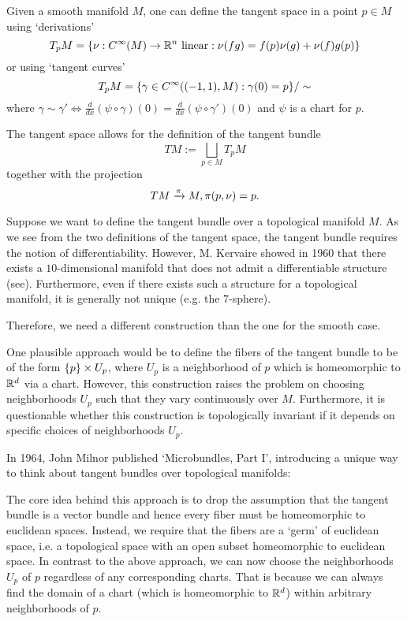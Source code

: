\begin{myparagraph}
    Given a smooth manifold $M$,
    one can define the tangent space
    in a point $p \in M$ using `derivations'
    \[
        T_p M = \{\nu: C^\infty(M) \to \mathbb{R}^n \text{ linear}:\nu(fg)
        = f(p)\nu(g) + \nu(f)g(p)\}
    \]
    or using `tangent curves'
    \[ T_p M = \{\gamma \in C^\infty((-1, 1), M):\gamma(0) = p \} / \sim \]
    where $\gamma \sim \gamma' \iff \frac{d}{dx}(\psi \circ \gamma)(0) = \frac{d}{dx}(\psi \circ \gamma')(0)$
    and $\psi$ is a chart for $p$.

    The tangent space allows for the definition of the tangent bundle
    \[ TM := \bigsqcup_{p \in M} T_p M\]
    together with the projection
    \[ TM \xrightarrow{\pi} M, \pi(p, \nu) = p. \]

    Suppose we want to define the tangent bundle over a topological manifold $M$.
    As we see from the two definitions of the tangent space,
    the tangent bundle requires the notion of differentiability.
    However, M. Kervaire showed in 1960 that there exists a $10$-dimensional manifold
    that does not admit a differentiable structure (see\cite{kervaire}).
    Furthermore, even if there exists such a structure for a topological manifold,
    it is generally not unique (e.g. the $7$-sphere\cite{milnor7sphere}).

    Therefore,
    we need a different construction than the one for the smooth case.
    
    One plausible approach would be to define the fibers of the tangent bundle
    to be of the form $\{p\} \times U_p$,
    where $U_p$ is a neighborhood of $p$ which is
    homeomorphic to $\mathbb{R}^d$ via a chart.
    However, this construction raises the problem
    on choosing neighborhoods $U_p$
    such that they vary continuously over $M$.
    Furthermore,
    it is questionable whether this construction is topologically
    invariant if it depends on specific choices of neighborhoods $U_p$.

    In 1964, John Milnor published `Microbundles, Part I',
    introducing a unique way to think
    about tangent bundles over topological manifolds:

    The core idea behind this approach is
    to drop the assumption
    that the tangent bundle is a vector bundle and hence
    every fiber must be homeomorphic to euclidean spaces.
    Instead, we require that the fibers are a `germ' of euclidean space,
    i.e. a topological space with an open subset homeomorphic to euclidean space.
    In contrast to the above approach,
    we can now choose the neighborhoods $U_p$ of $p$ regardless of any corresponding charts.
    That is because we can always find
    the domain of a chart (which is homeomorphic to $\mathbb{R}^d$) within arbitrary neighborhoods of $p$.


\end{myparagraph}
